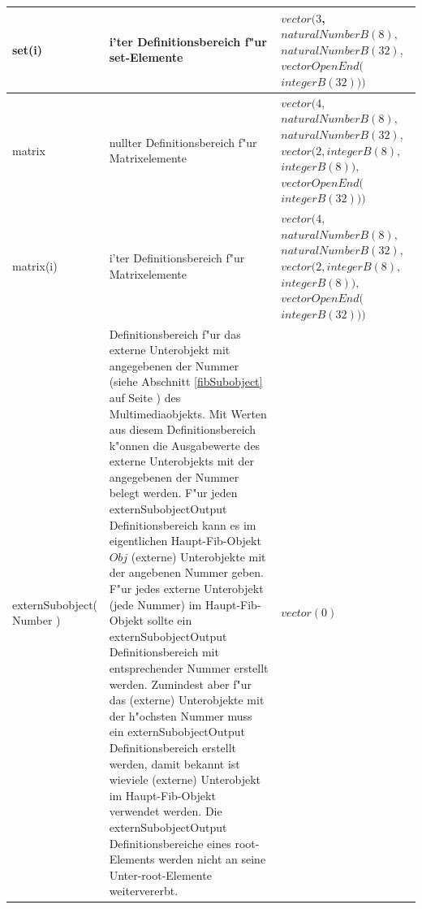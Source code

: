 \begin{small}
\begin{center}
\begin{longtable}{|p{18mm}|p{65mm}|p{35mm}|}
	set(i) & i'ter Definitionsbereich f"ur set-Elemente & $vector( 3$, $naturalNumberB(8),$ $naturalNumberB(32),$ $vectorOpenEnd($ $integerB(32) ) )$ \\\hline
	matrix & nullter Definitionsbereich f"ur Matrixelemente & $vector( 4$, $naturalNumberB(8),$ $naturalNumberB(32),$ $vector( 2, integerB(8),$ $integerB(8) ),$ $vectorOpenEnd($ $integerB(32) ) )$ \\\hline
	matrix(i) & i'ter Definitionsbereich f"ur Matrixelemente & $vector( 4$, $naturalNumberB(8),$ $naturalNumberB(32),$ $vector( 2, integerB(8),$ $integerB(8) ),$ $vectorOpenEnd($ $integerB(32) ) )$ \\\hline
	extern\-Subobject( Number ) & Definitionsbereich f"ur das externe Unterobjekt mit angegebenen der Nummer (siehe Abschnitt \ref{fibSubobject} auf Seite \pageref{fibSubobject}) des Multimediaobjekts. Mit Werten aus diesem Definitionsbereich k"onnen die Ausgabewerte des externe Unterobjekts mit der angegebenen der Nummer belegt werden. F"ur jeden externSubobjectOutput Definitionsbereich kann es im eigentlichen Haupt-Fib-Objekt $Obj$ (externe) Unterobjekte mit der angebenen Nummer geben. F"ur jedes externe Unterobjekt (jede Nummer) im Haupt-Fib-Objekt sollte ein externSubobjectOutput Definitionsbereich mit entsprechender Nummer erstellt werden. Zumindest aber f"ur das (externe) Unterobjekte mit der h"ochsten Nummer muss ein externSubobjectOutput Definitionsbereich erstellt werden, damit bekannt ist wieviele (externe) Unterobjekt im Haupt-Fib-Objekt verwendet werden. Die externSubobjectOutput Definitionsbereiche eines root-Elements werden nicht an seine Unter-root-Elemente weitervererbt. & $vector( 0 )$ \\\hline



\end{longtable}
\end{center}
\end{small}
